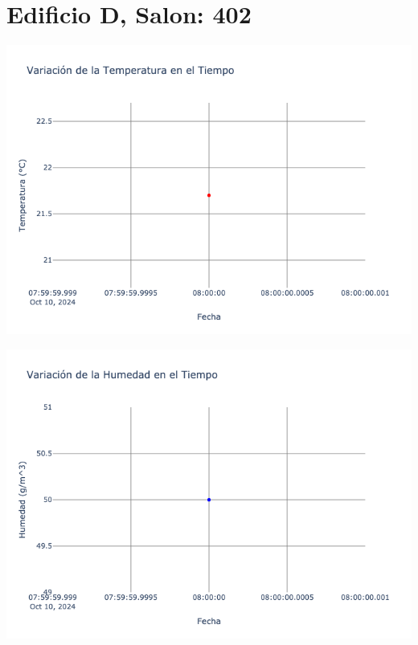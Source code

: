 \documentclass{article}
\begin{document}
    \section{Edificio D, Salon: 402}
    \noindent
    \begin{minipage}{0.48\textwidth}
        \centering
        \includegraphics[width=\textwidth]{../img/poli/TS402-90Dias-03-12-2024.png}
    \end{minipage}
    \hfill
    \begin{minipage}{0.48\textwidth}
        \centering
        \includegraphics[width=\textwidth]{../img/poli/HS402-90Dias-03-12-2024.png}
    \end{minipage}
\end{document}
